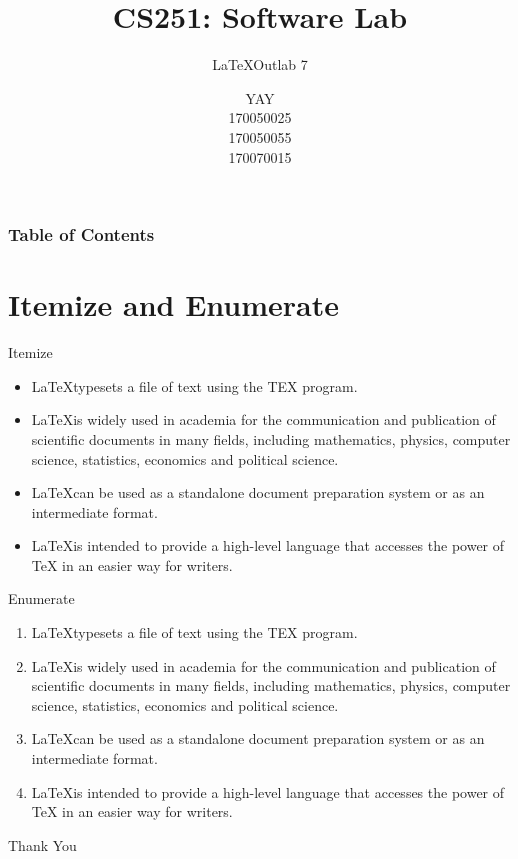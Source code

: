 \documentclass{beamer}
\title[CS251: Software Lab]
{CS251: Software Lab}
\subtitle{\LaTeX \space Outlab 7}
\author[YAY, 170050025, 170050055, 170070015]
{YAY \\ 170050025 \\ 170050055 \\ 170070015}
\institute[Indian Institute of Technology, Bombay]
{Indian Institute of Technology, Bombay}
\begin{document}
\frame{\titlepage}



\begin{frame}
\frametitle{Table of Contents}
\tableofcontents
\end{frame}

\section{Itemize and Enumerate}

\begin{frame}{Itemize}

\begin{itemize}
    \item \LaTeX \space typesets a file of text using the TEX program.
    \item \LaTeX \space is widely used in academia for the communication and
    publication of scientific documents in many fields, including
    mathematics, physics, computer science, statistics, economics
    and political science.
    \item \LaTeX \space can be used as a standalone document preparation
    system or as an intermediate format.
    \item \LaTeX \space is intended to provide a high-level language that
    accesses the power of TeX in an easier way for writers.
    
\end{itemize}
    
\end{frame}

\begin{frame}{Enumerate}

\begin{enumerate}
    \item \LaTeX \space typesets a file of text using the TEX program.
    \item \LaTeX \space is widely used in academia for the communication and
    publication of scientific documents in many fields, including
    mathematics, physics, computer science, statistics, economics
    and political science.
    \item \LaTeX \space can be used as a standalone document preparation
    system or as an intermediate format.
    \item \LaTeX \space is intended to provide a high-level language that
    accesses the power of TeX in an easier way for writers. 
\end{enumerate}
    
\end{frame}

\begin{frame}

 \centering \huge
  Thank You
\end{frame}
\end{document}
